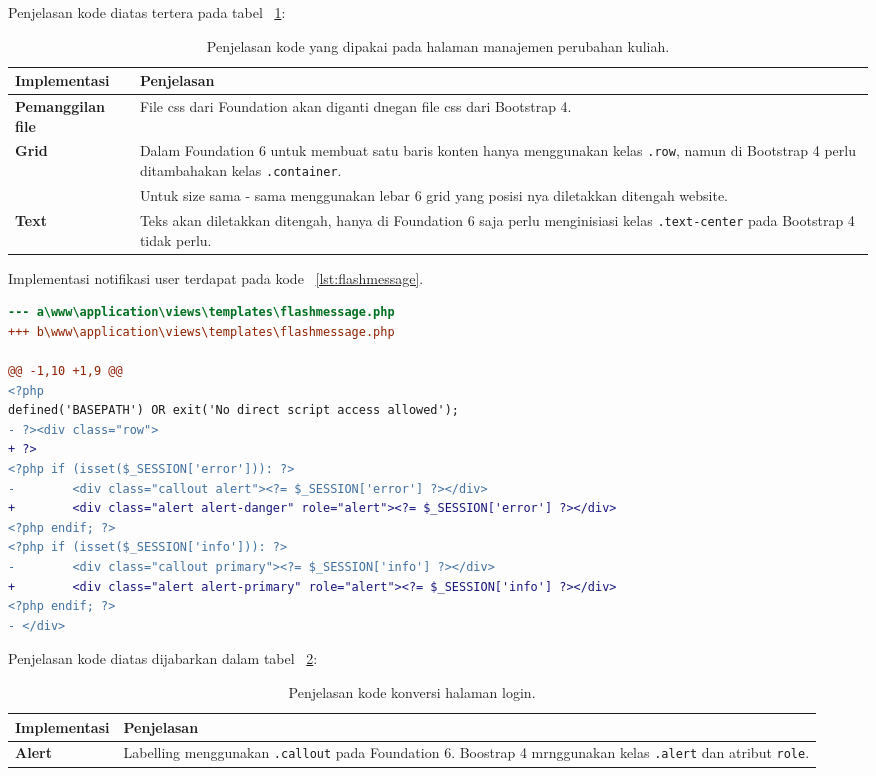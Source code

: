 \noindent Penjelasan kode diatas tertera pada tabel ~\ref{tabelKodeManajemenPerubahanKuliah}:
\begin{table}[H]
	\centering
	\begin{tabularx}{\textwidth}{lX}
		\toprule
		Implementasi     & Penjelasan \\
		\midrule
		\textbf{Pemanggilan file} & File css dari Foundation akan diganti dnegan file css dari Bootstrap 4.\\
		\textbf{Grid} & Dalam Foundation 6 untuk membuat satu baris konten hanya menggunakan kelas \texttt{.row}, namun di Bootstrap 4 perlu ditambahakan kelas \texttt{.container}.\\
		 & Untuk size sama - sama menggunakan lebar 6 grid yang posisi nya diletakkan ditengah website.\\
		\textbf{Text} & Teks akan diletakkan ditengah, hanya di Foundation 6 saja perlu menginisiasi kelas \texttt{.text-center} pada Bootstrap 4 tidak perlu.\\
		\bottomrule
	\end{tabularx}%
	\caption{Penjelasan kode yang dipakai pada halaman manajemen perubahan kuliah.}
	\label{tabelKodeManajemenPerubahanKuliah}
\end{table}

Implementasi notifikasi user terdapat pada kode ~\ref{lst:flashmessage}.

\begin{lstlisting}[language=diff, caption=Perubahan file \path{\views\templates\flashmessage.php},  basicstyle=\ttfamily, frame=single,
columns=fullflexible, keepspaces=true, breaklines=true, label={lst:flashmessage}]
--- a\www\application\views\templates\flashmessage.php
+++ b\www\application\views\templates\flashmessage.php

@@ -1,10 +1,9 @@
<?php
defined('BASEPATH') OR exit('No direct script access allowed');
- ?><div class="row">
+ ?>
<?php if (isset($_SESSION['error'])): ?>
-        <div class="callout alert"><?= $_SESSION['error'] ?></div>
+        <div class="alert alert-danger" role="alert"><?= $_SESSION['error'] ?></div>
<?php endif; ?>
<?php if (isset($_SESSION['info'])): ?>
-        <div class="callout primary"><?= $_SESSION['info'] ?></div>
+        <div class="alert alert-primary" role="alert"><?= $_SESSION['info'] ?></div>
<?php endif; ?>
- </div>

\end{lstlisting}

\noindent Penjelasan kode diatas dijabarkan dalam tabel ~\ref{tabelKodeLogin}:
\begin{table}[H]
	\centering
	\begin{tabularx}{\textwidth}{lX}
		\toprule
		Implementasi     & Penjelasan \\
		\midrule
		\textbf{Alert} & Labelling menggunakan \texttt{.callout} pada Foundation 6. Boostrap 4 mrnggunakan kelas \texttt{.alert} dan atribut \texttt{role}.\\
		\bottomrule
	\end{tabularx}%
	\caption{Penjelasan kode konversi halaman login.}
	\label{tabelKodeLogin}
\end{table}

